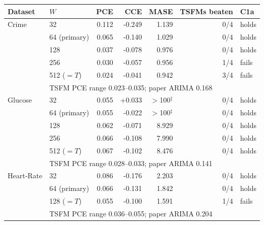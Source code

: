 \begin{tabular}{llrrrrl}
\toprule
Dataset & $W$ & PCE & CCE & MASE & TSFMs beaten & C1a \\
\midrule
Crime & 32 & 0.112 & -0.249 & 1.139 & 0/4 & holds \\
 & 64 (primary) & 0.065 & -0.140 & 1.029 & 0/4 & holds \\
 & 128 & 0.037 & -0.078 & 0.976 & 0/4 & holds \\
 & 256 & 0.030 & -0.057 & 0.956 & 1/4 & fails \\
 & 512 ($=T$) & 0.024 & -0.041 & 0.942 & 3/4 & fails \\
 & \multicolumn{6}{l}{\scriptsize TSFM PCE range 0.023--0.035; paper ARIMA 0.168} \\
\midrule
Glucose & 32 & 0.055 & +0.033 & $>$100$^\ddagger$ & 0/4 & holds \\
 & 64 (primary) & 0.055 & -0.022 & $>$100$^\ddagger$ & 0/4 & holds \\
 & 128 & 0.062 & -0.071 & 8.929 & 0/4 & holds \\
 & 256 & 0.066 & -0.108 & 7.990 & 0/4 & holds \\
 & 512 ($=T$) & 0.067 & -0.102 & 8.476 & 0/4 & holds \\
 & \multicolumn{6}{l}{\scriptsize TSFM PCE range 0.028--0.033; paper ARIMA 0.141} \\
\midrule
Heart-Rate & 32 & 0.086 & -0.176 & 2.203 & 0/4 & holds \\
 & 64 (primary) & 0.066 & -0.131 & 1.842 & 0/4 & holds \\
 & 128 ($=T$) & 0.055 & -0.100 & 1.591 & 1/4 & fails \\
 & \multicolumn{6}{l}{\scriptsize TSFM PCE range 0.036--0.055; paper ARIMA 0.204} \\
\bottomrule
\end{tabular}
